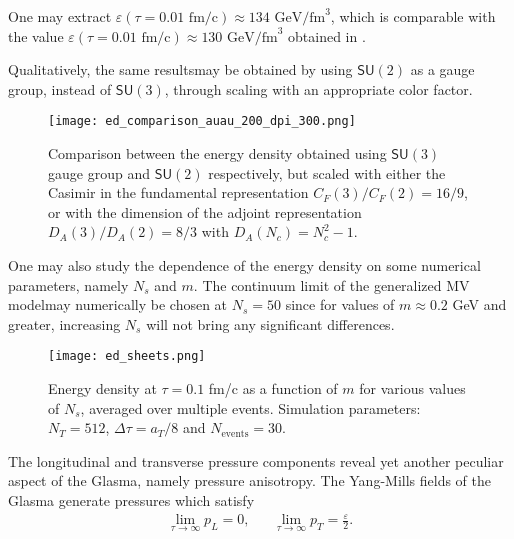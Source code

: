 One may extract $\varepsilon(\tau=0.01\text{ fm/c})\approx 134\text{ GeV/fm}^3$, which is comparable with the value $\varepsilon(\tau=0.01\text{ fm/c})\approx 130\text{ GeV/fm}^3$ obtained in \cite{lappiglasma}.

Qualitatively, the same resultsmay be obtained by using $\textsf{SU}(2)$ as a gauge group, instead of $\textsf{SU}(3)$, through scaling with an appropriate color factor.

\begin{figure}[!hbt]
	\texttt{[image: ed\_comparison\_auau\_200\_dpi\_300.png]}
	\caption{\normalsize Comparison between the energy density obtained using $\textsf{SU}(3)$ gauge group and $\textsf{SU}(2)$ respectively, but scaled with either the Casimir in the fundamental representation $C_F(3)/C_F(2)=16/9$, or with the dimension of the adjoint representation $D_A(3)/D_A(2)=8/3$ with $D_A(N_c)=N_c^2-1$.}
\end{figure}

One may also study the dependence of the energy density on some numerical parameters, namely $N_s$ and $m$. The continuum limit of the generalized {\sffamily MV} modelmay numerically be chosen at $N_s=50$ since for values of $m\approx 0.2$ GeV and greater, increasing $N_s$ will not bring any significant differences.

\begin{figure}[!hbt]
	\texttt{[image: ed\_sheets.png]}
	\caption{\normalsize Energy density at $\tau=0.1$ fm/c as a function of $m$ for various values of $N_s$, averaged over multiple events. Simulation parameters: $N_T=512$, $\Delta\tau=a_T/8$ and $N_\text{events}=30$.} 
\end{figure}

The longitudinal and transverse pressure components reveal yet another peculiar aspect of the Glasma, namely {\sffamily\color{ming}pressure anisotropy}. The Yang-Mills fields of the Glasma generate pressures which satisfy
\begin{equation*}
    \begin{aligned}
        \lim\limits_{\tau\rightarrow\infty}p_L=0, && \lim\limits_{\tau\rightarrow\infty}p_T=\frac{\varepsilon}{2}.
    \end{aligned}
\end{equation*}

